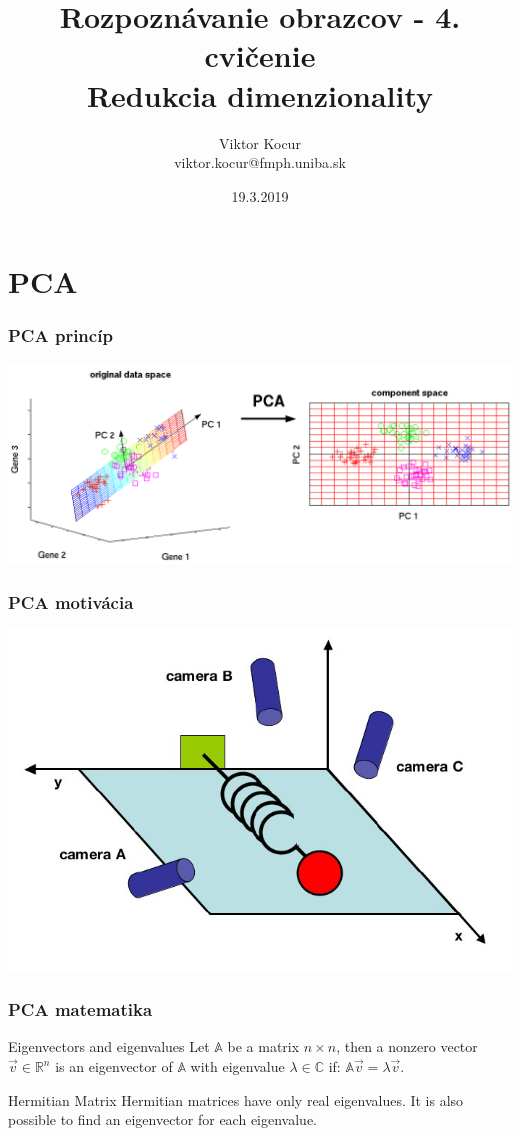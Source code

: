 \documentclass{beamer}
\title[PCA a LDA]{Rozpoznávanie obrazcov - 4. cvičenie \\ Redukcia dimenzionality}
\author[Viktor Kocur]{Viktor Kocur \\{\small viktor.kocur@fmph.uniba.sk}}
\institute{DAI FMFI UK}
\date{19.3.2019}
\begin{document}

\begin{frame}[plain]
  \titlepage  
\end{frame}

\section{PCA}

\begin{frame}
\frametitle{PCA princíp}
\includegraphics[width=\textwidth]{PCA.png}
\end{frame}


\begin{frame}
\frametitle{PCA motivácia}
\includegraphics[width=\textwidth]{PCAcameras.png}
\end{frame}


\begin{frame}
\frametitle{PCA matematika}

\begin{block}{Eigenvectors and eigenvalues}
Let $\mathbb{A}$ be a matrix $n \times n$, then a nonzero vector $\vec{v} \in \mathbb{R}^n$ is an eigenvector of $\mathbb{A}$ with eigenvalue $\lambda \in \mathbb{C}$ if: $\mathbb{A}\vec{v} = \lambda \vec{v}$. 
\end{block}

\begin{block}{Hermitian Matrix}
Hermitian matrices have only real eigenvalues. It is also possible to find an eigenvector for each eigenvalue.
\end{block}
\end{frame}
\end{document}
